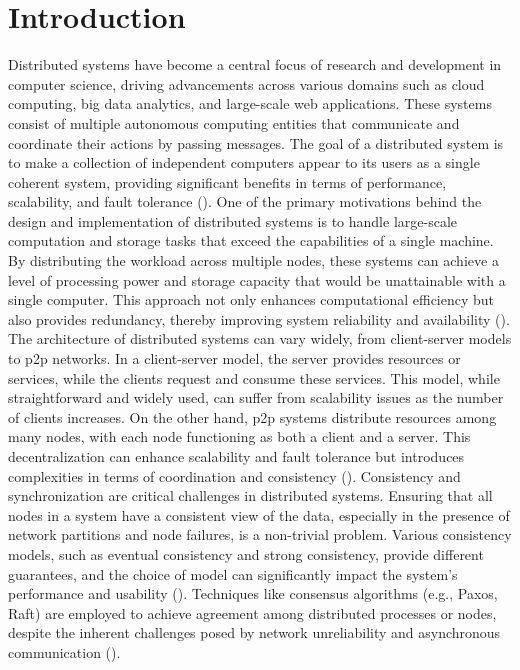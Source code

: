 \chapter{Introduction}\label{chap:intro}
Distributed systems have become a central focus of research and development in computer science, driving advancements across various domains such as cloud computing, big data analytics, and large-scale web applications.
These systems consist of multiple autonomous computing entities that communicate and coordinate their actions by passing messages.
The goal of a distributed system is to make a collection of independent computers appear to its users as a single coherent system, providing significant benefits in terms of performance, scalability, and fault tolerance (\cite{distributed-systems}).
One of the primary motivations behind the design and implementation of distributed systems is to handle large-scale computation and storage tasks that exceed the capabilities of a single machine.
By distributing the workload across multiple nodes, these systems can achieve a level of processing power and storage capacity that would be unattainable with a single computer.
This approach not only enhances computational efficiency but also provides redundancy, thereby improving system reliability and availability (\cite{coulouris2005distributed}).
The architecture of distributed systems can vary widely, from client-server models to \gls{p2p} networks. In a client-server model, the server provides resources or services, while the clients request and consume these services.
This model, while straightforward and widely used, can suffer from scalability issues as the number of clients increases.
On the other hand, \gls{p2p} systems distribute resources among many nodes, with each node functioning as both a client and a server.
This decentralization can enhance scalability and fault tolerance but introduces complexities in terms of coordination and consistency (\cite{coulouris2005distributed}).
Consistency and synchronization are critical challenges in distributed systems.
Ensuring that all nodes in a system have a consistent view of the data, especially in the presence of network partitions and node failures, is a non-trivial problem.
Various consistency models, such as eventual consistency and strong consistency, provide different guarantees, and the choice of model can significantly impact the system's performance and usability (\cite{vogels2009}).
Techniques like consensus algorithms (e.g., Paxos, Raft) are employed to achieve agreement among distributed processes or nodes, despite the inherent challenges posed by network unreliability and asynchronous communication (\cite{lamport2001paxos}).
